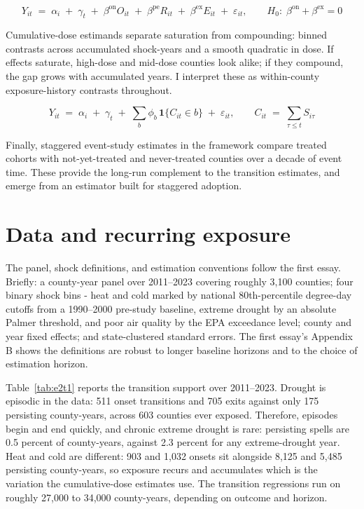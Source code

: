 \documentclass[a4paper,11pt]{article}
\begin{document}
\begin{equation}
Y_{it} \;=\; \alpha_i \;+\; \gamma_t \;+\; \beta^{\mathrm{on}} O_{it}
\;+\; \beta^{\mathrm{pe}} R_{it} \;+\; \beta^{\mathrm{ex}} E_{it} \;+\; \varepsilon_{it},
\qquad H_0:\; \beta^{\mathrm{on}} + \beta^{\mathrm{ex}} = 0
\label{eq:transition}
\end{equation}

Cumulative-dose estimands separate saturation from compounding: binned contrasts across accumulated shock-years and a smooth quadratic in dose. If effects saturate, high-dose and mid-dose counties look alike; if they compound, the gap grows with accumulated years. I interpret these as within-county exposure-history contrasts throughout.

\begin{equation}
Y_{it} \;=\; \alpha_i \;+\; \gamma_t \;+\; \sum_{b} \phi_b \,
\mathbf{1}\{C_{it} \in b\} \;+\; \varepsilon_{it},
\qquad C_{it} \;=\; \sum_{\tau \le t} S_{i\tau}
\label{eq:dose}
\end{equation}

Finally, staggered event-study estimates in the \citet{callaway2021did} framework compare treated cohorts with not-yet-treated and never-treated counties over a decade of event time. These provide the long-run complement to the transition estimates, and emerge from an estimator built for staggered adoption.

\FloatBarrier
\section{Data and recurring exposure}

The panel, shock definitions, and estimation conventions follow the first essay. Briefly: a county-year panel over 2011--2023 covering roughly 3,100 counties; four binary shock bins - heat and cold marked by national 80th-percentile degree-day cutoffs from a 1990--2000 pre-study baseline, extreme drought by an absolute Palmer threshold, and poor air quality by the EPA exceedance level; county and year fixed effects; and state-clustered standard errors. The first essay's Appendix B shows the definitions are robust to longer baseline horizons and to the choice of estimation horizon.

Table~\ref{tab:e2t1} reports the transition support over 2011--2023. Drought is episodic in the data: 511 onset transitions and 705 exits against only 175 persisting county-years, across 603 counties ever exposed. Therefore, episodes begin and end quickly, and chronic extreme drought is rare: persisting spells are 0.5 percent of county-years, against 2.3 percent for any extreme-drought year. Heat and cold are different: 903 and 1,032 onsets sit alongside 8,125 and 5,485 persisting county-years, so exposure recurs and accumulates which is the variation the cumulative-dose estimates use. The transition regressions run on roughly 27,000 to 34,000 county-years, depending on outcome and horizon.
\end{document}

